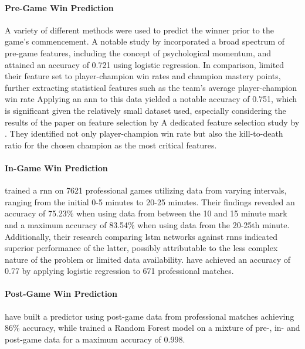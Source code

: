 \documentclass[12pt, a4paper, headinclude, twoside, plainheadsepline, open=right, numbers=noenddot, hidelinks, toc=listof, toc=bibliography]{scrreprt}
\begin{document}
\paragraph{Pre-Game Win Prediction}
A variety of different methods were used to predict the winner prior to the game's commencement.
A notable study by \citeauthor{whiteScalablePsychologicalMomentum2020} \cite{whiteScalablePsychologicalMomentum2020} incorporated a broad spectrum of pre-game features, including the concept of psychological momentum, and attained an accuracy of 0.721 using logistic regression.
In comparison, \citeauthor{doUsingMachineLearning2021} \cite{doUsingMachineLearning2021} 
limited their feature set to player-champion win rates and champion mastery points, further extracting statistical features such as the team's average player-champion win rate
Applying an \ac{ann} to this data yielded a notable accuracy of 0.751, which is significant given the relatively small dataset used, especially considering the results of the paper on feature selection by 
A dedicated feature selection study by \citeauthor{costaFeatureAnalysisLeague2021} \cite{costaFeatureAnalysisLeague2021}.
They identified not only player-champion win rate but also the kill-to-death ratio for the chosen champion as the most critical features.

\paragraph{In-Game Win Prediction}
 \cite{silvaContinuousOutcomePrediction2018} trained a \acf{rnn} on 7621 professional games  utilizing data from varying intervals, ranging from the initial 0-5 minutes to 20-25 minutes.
Their findings revealed an accuracy of 75.23\% when using data from between the 10 and 15 minute mark and a maximum accuracy of 83.54\% when using data from the 20-25th minute.
Additionally, their research comparing \ac{lstm} networks against \acp{rnn} indicated superior performance of the latter, possibly attributable to the less complex nature of the problem or limited data availability.
\citeauthor{baileyStatisticalLearningEsports} \cite{baileyStatisticalLearningEsports} have achieved an accuracy of 0.77 by applying logistic regression to 671 professional matches.

\paragraph{Post-Game Win Prediction}
\citeauthor{bahrololloomiESportsPlayerPerformance2023} \cite{bahrololloomiESportsPlayerPerformance2023} have built a predictor using post-game data from professional matches achieving 86\% accuracy, while \citeauthor{aniVictoryPredictionLeague2019} \cite{aniVictoryPredictionLeague2019} trained a Random Forest model on a mixture of pre-, in- and post-game data for a maximum accuracy of 0.998.
\end{document}
